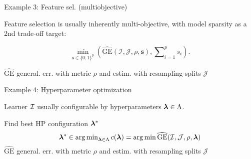 \documentclass[11pt,compress,t,notes=noshow, xcolor=table]{beamer}
\begin{document}
\begin{frame2}{Example 3: Feature sel. (multiobjective)}

Feature selection is usually inherently multi-objective,
with model sparsity as a 2nd trade-off target:

$$
\min_{\textbf{s} \in \{0, 1\}^p} \left(\widehat{\text{GE}}(\mathcal{I}, \mathcal{J}, \rho, \bm{s}), \sum\nolimits_{i = 1}^p s_i\right).
$$

$\widehat{\text{GE}}$ general. err. with metric $\rho$ and estim. with resampling splits $\mathcal{J}$

\spacer


\end{frame2}

\begin{frame2}{Example 4: Hyperparameter optimization}
\begin{itemizeL}
\item Learner $\mathcal{I}$ usually configurable by hyperparameters $\bm{\lambda} \in \Lambda$.
\item Find best HP configuration $\bm{\lambda}^\ast$
$$
\bm{\lambda}^\ast \in \mathop{\mathrm{arg\,min}}\nolimits_{\bm{\lambda} \in \Lambda} c(\bm{\lambda}) = \mathop{\mathrm{arg\,min}} \widehat{\text{GE}}(\mathcal{I}, \mathcal{J}, \rho, \bm{\lambda})
$$
$\widehat{\text{GE}}$ general. err. with metric $\rho$ and estim. with resampling splits $\mathcal{J}$
\end{itemizeL}

\spacer

\end{frame2}
\end{document}
